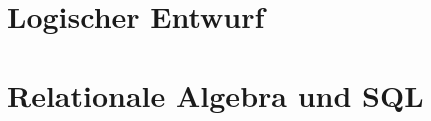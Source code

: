\documentclass[ngerman]{gdb-aufgabenblatt}
\begin{document}
%
%
%
%
%
%
%


\section{Logischer Entwurf}



\section{Relationale Algebra und SQL}
\end{document}
